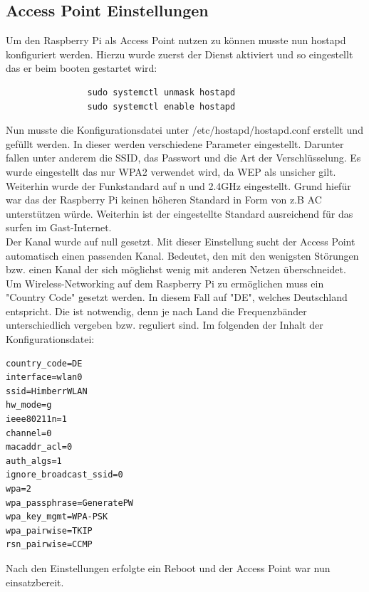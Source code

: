 \documentclass[a4paper,11pt,singlespacing]{article}
\begin{document}
            \subsection{Access Point Einstellungen}
                Um den Raspberry Pi als Access Point nutzen zu können musste nun hostapd konfiguriert werden. Hierzu wurde zuerst der Dienst aktiviert und so eingestellt das er beim booten gestartet wird:
                  \begin{lstlisting}
                sudo systemctl unmask hostapd
                sudo systemctl enable hostapd
                  \end{lstlisting} 
                
                    Nun musste die Konfigurationsdatei unter /etc/hostapd/hostapd.conf erstellt und gefüllt werden.
                    In dieser werden verschiedene Parameter eingestellt. Darunter fallen unter anderem die SSID, das Passwort und die Art der Verschlüsselung. Es wurde eingestellt das nur WPA2 verwendet wird, da WEP als unsicher gilt. Weiterhin wurde der Funkstandard auf n und 2.4GHz eingestellt. Grund hiefür war das der Raspberry Pi keinen höheren Standard in Form von z.B AC unterstützen würde. Weiterhin ist der eingestellte Standard ausreichend  für das surfen im Gast-Internet. \\
                    Der Kanal wurde auf null gesetzt. Mit dieser Einstellung sucht der Access Point automatisch einen passenden Kanal. Bedeutet, den mit den wenigsten Störungen bzw. einen Kanal der sich möglichst wenig mit anderen Netzen überschneidet.\\
                    Um Wireless-Networking auf dem Raspberry Pi zu ermöglichen muss ein "Country Code" gesetzt werden. In diesem Fall auf "DE", welches Deutschland entspricht. Die ist notwendig, denn je nach Land die Frequenzbänder unterschiedlich vergeben bzw. reguliert sind. Im folgenden der Inhalt der Konfigurationsdatei:
 
                
                    \begin{lstlisting}
country_code=DE
interface=wlan0
ssid=HimberrWLAN
hw_mode=g
ieee80211n=1
channel=0
macaddr_acl=0
auth_algs=1
ignore_broadcast_ssid=0
wpa=2
wpa_passphrase=GeneratePW
wpa_key_mgmt=WPA-PSK
wpa_pairwise=TKIP
rsn_pairwise=CCMP
                    \end{lstlisting} 
                   
                   Nach den Einstellungen erfolgte ein Reboot und der Access Point war nun einsatzbereit.
                
\end{document}
